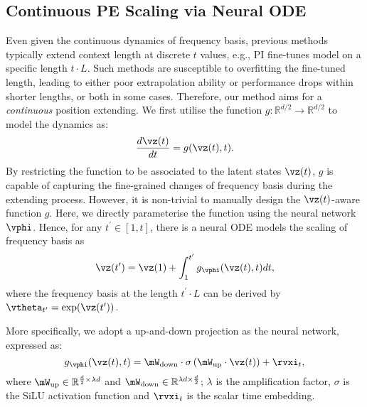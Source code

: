 \subsection{Continuous PE Scaling via Neural ODE}
Even given the continuous dynamics of frequency basis, previous methods typically extend context length at discrete $t$ values, e.g., PI fine-tunes model on a specific length $t \cdot L$. Such methods are susceptible to overfitting the fine-tuned length, leading to either poor extrapolation ability or performance drops within shorter lengths, or both in some cases. Therefore, our method aims for a \textit{continuous} position extending. We first utilise the function $g\colon \mathbb{R}^{d/2} \to \mathbb{R}^{d/2}$ to model the dynamics as:
\begin{equation}
    \frac{d \vz(t)} {d t} = g(\vz(t), t).
\end{equation}
By restricting the function to be associated to the latent states $\vz(t)$, $g$ is capable of capturing the fine-grained changes of frequency basis during the extending process. However, it is non-trivial to manually design the $\vz(t)$-aware function $g$. Here, we directly parameterise the function using the neural network $\vphi$. Hence, for any $t^{\prime} \in [1, t]$, there is a neural ODE models the scaling of frequency basis as
\begin{equation}
\label{eq:ode}
    \vz(t^\prime) = \vz(1) + \int_1^{t^\prime} g_\vphi(\vz(t), t) d t,
\end{equation}
where the frequency basis at the length $t^{\prime} \!\cdot\! L$ can be derived by $\vtheta_{t^\prime}=\exp(\vz(t^\prime))$.

More specifically, we adopt a up-and-down projection as the neural network, expressed as:
\begin{equation}
\label{eq:network}
    g_\vphi(\vz(t), t) = \mW_{\text{down}} \cdot \sigma\left( \mW_{\text{up}}\cdot \vz(t)\right) + \rvxi_t,
\end{equation}
where $\mW_{\text{up}} \in \mathbb{R}^{\frac{d}{2} \times \lambda d}$ and $\mW_{\text{down}} \in \mathbb{R}^{\lambda d \times \frac{d}{2} }$; $\lambda$ is the amplification factor, $\sigma$ is the SiLU activation function and $\rvxi_t$ is the scalar time embedding.





